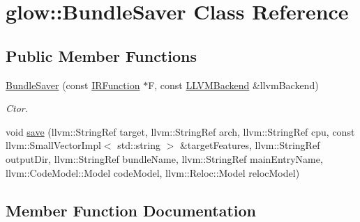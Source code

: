 \hypertarget{classglow_1_1_bundle_saver}{}\section{glow\+:\+:Bundle\+Saver Class Reference}
\label{classglow_1_1_bundle_saver}
\subsection*{Public Member Functions}
\begin{DoxyCompactItemize}
\item 
\mbox{\label{classglow_1_1_bundle_saver_a76c82e498be587f686cc1bc615e695f9}} 
\hyperlink{classglow_1_1_bundle_saver_a76c82e498be587f686cc1bc615e695f9}{Bundle\+Saver} (const \hyperlink{classglow_1_1_i_r_function}{I\+R\+Function} $\ast$F, const \hyperlink{classglow_1_1_l_l_v_m_backend}{L\+L\+V\+M\+Backend} \&llvm\+Backend)
\begin{DoxyCompactList}\small\item\em Ctor. \end{DoxyCompactList}\item 
void \hyperlink{classglow_1_1_bundle_saver_ac116e0fb9acbfc13fc8a5d6c3abaedb0}{save} (llvm\+::\+String\+Ref target, llvm\+::\+String\+Ref arch, llvm\+::\+String\+Ref cpu, const llvm\+::\+Small\+Vector\+Impl$<$ std\+::string $>$ \&target\+Features, llvm\+::\+String\+Ref output\+Dir, llvm\+::\+String\+Ref bundle\+Name, llvm\+::\+String\+Ref main\+Entry\+Name, llvm\+::\+Code\+Model\+::\+Model code\+Model, llvm\+::\+Reloc\+::\+Model reloc\+Model)
\end{DoxyCompactItemize}


\subsection{Member Function Documentation}
\mbox{\label{classglow_1_1_bundle_saver_ac116e0fb9acbfc13fc8a5d6c3abaedb0}} 
